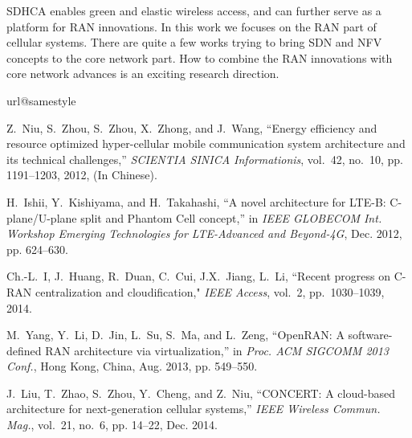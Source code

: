 \documentclass[12pt, draftclsnofoot,onecolumn]{IEEEtran}
\begin{document}
SDHCA enables green and elastic
wireless access, and can further serve as a platform for RAN innovations.
In this work we focuses on the RAN part of cellular systems. There are quite a
few works trying to bring SDN and NFV concepts to the core network part.
How to combine the RAN innovations with core network advances is an exciting
research direction.



\begin{thebibliography}{99}
\providecommand{\url}[1]{#1}
\csname url@samestyle\endcsname
\providecommand{\newblock}{\relax}
\providecommand{\bibinfo}[2]{#2}
\providecommand{\BIBentrySTDinterwordspacing}{\spaceskip=0pt\relax}
\providecommand{\BIBentryALTinterwordstretchfactor}{4}
\providecommand{\BIBentryALTinterwordspacing}{\spaceskip=\fontdimen2\font plus
\BIBentryALTinterwordstretchfactor\fontdimen3\font minus
  \fontdimen4\font\relax}
\providecommand{\BIBforeignlanguage}[2]{{\expandafter\ifx\csname l@#1\endcsname\relax
\typeout{** WARNING: IEEEtran.bst: No hyphenation pattern has been}\typeout{** loaded for the language `#1'. Using the pattern for}\typeout{** the default language instead.}\else
\language=\csname l@#1\endcsname
\fi
#2}}
\providecommand{\BIBdecl}{\relax}
\BIBdecl

Z.~Niu, S.~Zhou, S.~Zhou, X.~Zhong, and J.~Wang, ``Energy efficiency and
  resource optimized hyper-cellular mobile communication system architecture
  and its technical challenges,'' \emph{SCIENTIA SINICA Informationis},
  vol.~42, no.~10, pp. 1191--1203, 2012, (In Chinese).

H.~Ishii, Y.~Kishiyama, and H.~Takahashi, ``A novel architecture for {LTE-B}:
  {C}-plane/{U}-plane split and {P}hantom {C}ell concept,'' in \emph{IEEE
  GLOBECOM Int. Workshop Emerging Technologies for LTE-Advanced and Beyond-4G},
  Dec. 2012, pp. 624--630.

Ch.-L.~I, J.~Huang, R.~Duan, C.~Cui, J.X.~Jiang, L.~Li, ``Recent progress on C-RAN centralization and cloudification," \emph{IEEE Access}, vol.~2, pp.~1030--1039, 2014.

M.~Yang, Y.~Li, D.~Jin, L.~Su, S.~Ma, and L.~Zeng, ``{O}pen{RAN}: A
  software-defined {RAN} architecture via virtualization,'' in \emph{Proc. ACM
  SIGCOMM 2013 Conf.}, Hong Kong, China, Aug. 2013, pp. 549--550.

J.~Liu, T.~Zhao, S.~Zhou, Y.~Cheng, and Z.~Niu, ``{CONCERT}: A cloud-based
  architecture for next-generation cellular systems,'' \emph{{IEEE} Wireless
  Commun. Mag.}, vol.~21, no.~6, pp. 14--22, Dec. 2014.


\end{thebibliography}
\end{document}
